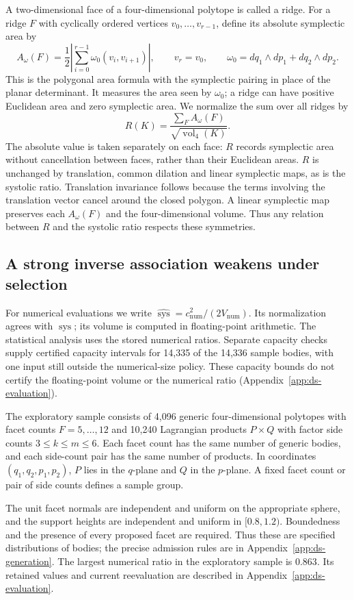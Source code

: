 A two-dimensional face of a four-dimensional polytope is called a ridge.
For a ridge $F$ with cyclically ordered vertices $v_0,\ldots,v_{r-1}$, define
its absolute symplectic area by
\[
 A_\omega(F)=\frac12\left|\sum_{i=0}^{r-1}\omega_0(v_i,v_{i+1})\right|,
 \qquad v_r=v_0,\qquad
 \omega_0=dq_1\wedge dp_1+dq_2\wedge dp_2.
\]
This is the polygonal area formula with the symplectic pairing in place
of the planar determinant. It measures the area seen by $\omega_0$; a
ridge can have positive Euclidean area and zero symplectic area. We
normalize the sum over all ridges by
\[
 R(K)=\frac{\sum_F A_\omega(F)}{\sqrt{\operatorname{vol}_4(K)}}.
\]
The absolute value is taken separately on each face: $R$ records symplectic
area without cancellation between faces, rather than their Euclidean areas.
$R$ is unchanged by translation, common dilation and linear symplectic
maps, as is the systolic ratio.
Translation invariance follows because the terms involving the
translation vector cancel around the closed polygon. A linear symplectic
map preserves each $A_\omega(F)$ and the four-dimensional volume.
Thus any relation between $R$ and the systolic ratio respects these symmetries.

\subsection{A strong inverse association weakens under selection}

For numerical evaluations we write
$\widehat{\operatorname{sys}}=c_{\mathrm{num}}^2/(2V_{\mathrm{num}})$.
Its normalization agrees with $\operatorname{sys}$; its volume is computed
in floating-point arithmetic. The statistical analysis uses the stored
numerical ratios. Separate capacity checks supply certified capacity
intervals for 14,335 of the 14,336 sample bodies, with one input still
outside the numerical-size policy. These capacity bounds do not certify
the floating-point volume or the numerical ratio
(Appendix~\ref{app:ds-evaluation}).

The exploratory sample consists of 4,096 generic four-dimensional polytopes
with facet counts $F=5,\ldots,12$ and 10,240 Lagrangian products $P\times Q$
with factor side counts $3\leq k\leq m\leq6$. Each facet count has the
same number of generic bodies, and each side-count pair has the same
number of products. In coordinates $(q_1,q_2,p_1,p_2)$, $P$ lies in the $q$-plane and
$Q$ in the $p$-plane. A fixed facet count or pair of side counts defines a
sample group.

The unit facet normals are independent and uniform on the appropriate
sphere, and the support heights are independent and uniform in
$[0.8,1.2)$. Boundedness and the presence of every proposed facet are
required. Thus these are specified distributions of bodies; the precise
admission rules are in Appendix~\ref{app:ds-generation}. The largest
numerical ratio in the exploratory sample is $0.863$. Its retained values
and current reevaluation are described in Appendix~\ref{app:ds-evaluation}.

